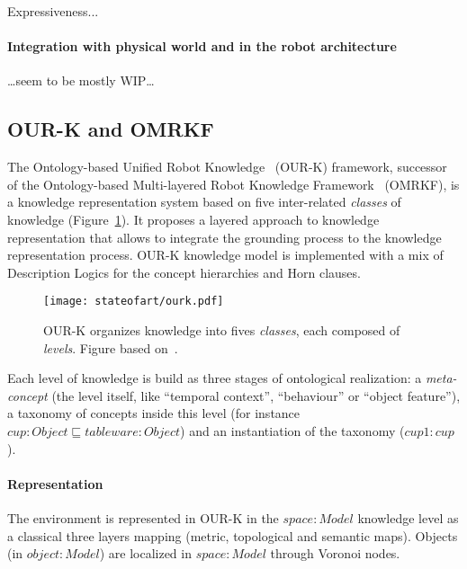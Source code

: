 Expressiveness...

\paragraph{Integration with physical world and in the robot architecture}
\label{sect|nkrl-integration}

\ldots seem to be mostly WIP\ldots

\subsection{OUR-K and OMRKF}
\label{sect|omrkf}

The Ontology-based Unified Robot
Knowledge~\cite{Lim2011} (OUR-K) framework, successor of the Ontology-based Multi-layered Robot Knowledge Framework~\cite{Suh2007}
(OMRKF), is a knowledge representation system based on five inter-related
\emph{classes} of knowledge (Figure~\ref{fig|omrkf}). It proposes a layered
approach to knowledge representation that allows to integrate the grounding
process to the knowledge representation process. OUR-K knowledge model is
implemented with a mix of Description Logics for the concept hierarchies and Horn clauses.

\begin{figure}
    \centering
    \texttt{[image: stateofart/ourk.pdf]}

    \caption{OUR-K organizes knowledge into fives \emph{classes}, each composed
    of \emph{levels}. Figure based on~\cite{Lim2011}.}

    \label{fig|omrkf}
\end{figure}

Each level of knowledge is build as three stages of ontological realization: a
\emph{meta-concept} (the level itself, like ``temporal context'', ``behaviour''
or ``object feature''), a taxonomy of concepts inside this level (for instance
$cup : Object \sqsubseteq tableware : Object$) and an instantiation of the
taxonomy ($cup1 : cup$).

\paragraph{Representation} The environment is represented in OUR-K in the
$space : Model$ knowledge level as a classical three layers mapping (metric,
topological and semantic maps). Objects (in $object : Model$) are localized in
$space : Model$ through Voronoi nodes.

